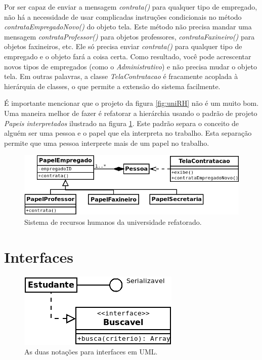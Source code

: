 \documentclass[
	article,			%
	12pt,				%
	openright,
	twoside,			%
	a4paper,			%
	english,			%
	french,
	brazil,				%
	sumario=tradicional
	]{abntex2}
\begin{document}
Por ser capaz de enviar a mensagem \emph{contrata()} para qualquer tipo de empregado, não há a necessidade de usar complicadas instruções condicionais no método \emph{contrataEmpregadoNovo()} do objeto tela. Este método não precisa mandar uma mensagem \emph{contrataProfessor()} para objetos professores, \emph{contrataFaxineiro()} para objetos faxineiros, etc. Ele só precisa enviar \emph{contrata()} para qualquer tipo de empregado e o objeto fará a coisa certa. Como resultado, você pode acrescentar novos tipos de empregados (como o \emph{Administrativo}) e não precisa mudar o objeto tela. Em outras palavras, a classe \emph{TelaContratacao} é fracamente acoplada à hierárquia de classes, o que permite a extensão do sistema facilmente.

É importante mencionar que o projeto da figura \ref{fig:uniRH} não é um muito bom. Uma maneira melhor de fazer é refatorar a hierárchia usando o padrão de projeto \emph{Papeis interpretados} ilustrado na figura \ref{fig:uniRH2}. Este padrão separa o conceito de alguém ser uma pessoa e o papel que ela interpreta no trabalho. Esta separação permite que uma pessoa interprete mais de um papel no trabalho.

\begin{figure}[b]
\begin{center}
\includegraphics[scale=0.65]{uniRH2.png}
\end{center}
\caption{Sistema de recursos humanos da universidade refatorado.} \label{fig:uniRH2}
\end{figure}

\section{Interfaces}

\begin{figure}
\begin{center}
\includegraphics[scale=0.7]{ifcUml.png}
\end{center}
\caption{As duas notações para interfaces em UML.} \label{fig:ifcUml}
\end{figure}
\end{document}
